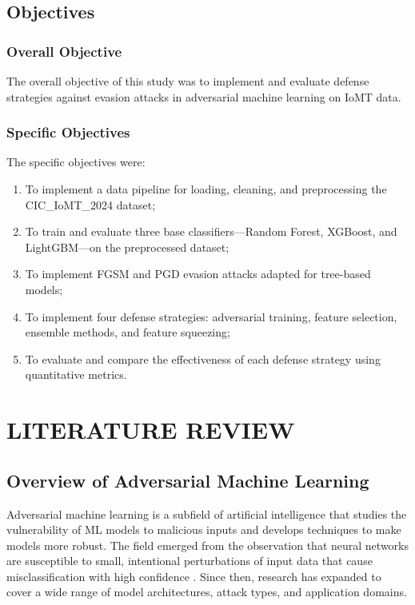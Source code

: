 \documentclass[12pt,a4paper,oneside]{report}
\begin{document}
\section{Objectives}

\subsection{Overall Objective}

The overall objective of this study was to implement and evaluate defense strategies against evasion attacks in adversarial machine learning on IoMT data.

\subsection{Specific Objectives}

The specific objectives were:

\begin{enumerate}
    \item To implement a data pipeline for loading, cleaning, and preprocessing the CIC\_IoMT\_2024 dataset;
    \item To train and evaluate three base classifiers---Random Forest, XGBoost, and LightGBM---on the preprocessed dataset;
    \item To implement FGSM and PGD evasion attacks adapted for tree-based models;
    \item To implement four defense strategies: adversarial training, feature selection, ensemble methods, and feature squeezing;
    \item To evaluate and compare the effectiveness of each defense strategy using quantitative metrics.
\end{enumerate}


\chapter{LITERATURE REVIEW}

\section{Overview of Adversarial Machine Learning}

Adversarial machine learning is a subfield of artificial intelligence that studies the vulnerability of ML models to malicious inputs and develops techniques to make models more robust. The field emerged from the observation that neural networks are susceptible to small, intentional perturbations of input data that cause misclassification with high confidence \cite{szegedy2013intriguing}. Since then, research has expanded to cover a wide range of model architectures, attack types, and application domains.
\end{document}
